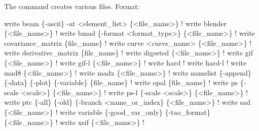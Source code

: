 {{{{{{{{{The  command creates various files.
Format:
\begin{example}
  write beam \{-ascii\} -at <element_list> \{<file_name>\}                    ! 
  write blender \{<file_name>\}                                             ! 
  write bmad \{-format <format_type>\} \{<file_name>\}                        ! 
  write covariance_matrix \{file_name\}                                     ! 
  write curve <curve_name> \{<file_name>\}                                  ! 
  write derivative_matrix \{file_name\}                                     ! 
  write digested \{<file_name>\}                                            ! 
  write gif \{<file_name>\}                                                 ! 
  write gif-l \{<file_name>\}                                               ! 
  write hard                                                              ! 
  write hard-l                                                            ! 
  write mad8 \{<file_name>\}                                                ! 
  write madx \{<file_name>\}                                                ! 
  write namelist \{-append\} \{-data\} \{-plot\} \{-variable\} \{file_name\}        ! 
  write opal \{file_name\}                                                  ! 
  write ps \{-scale <scale>\} \{<file_name>\}                                 !   
  write ps-l \{-scale <scale>\} \{<file_name>\}                               ! 
  write ptc \{-all\} \{-old\} \{-branch <name_or_index\} \{<file_name>\}          ! 
  write sad \{<file_name>\}                                                 ! 
  write variable \{-good_var_only\} \{-tao_format\} \{<file_name>\}               ! 
  write xsif \{<file_name>\}                                                ! 
\end{example}



}}}}}}}}}
